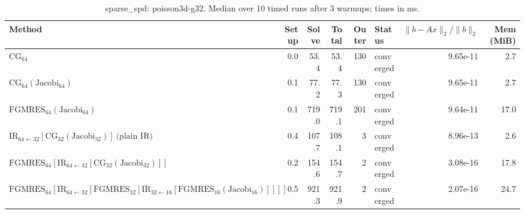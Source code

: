 \begin{table}[t]
\centering
\small
\caption{sparse_spd: poisson3d-g32. Median over 10 timed runs after 3 warmups; times in ms.}
\label{tab:sparse_spd-poisson3d-g32}
\begin{tabular}{lrrrrlrr}
\hline
Method & Setup & Solve & Total & Outer & Status & $\|b-Ax\|_2/\|b\|_2$ & Mem (MiB) \\
\hline
$\mathrm{CG}_{64}$ & 0.0 & 53.4 & 53.4 & 130 & converged & 9.65e-11 & 2.7 \\
$\mathrm{CG}_{64}(\mathrm{Jacobi}_{64})$ & 0.1 & 77.2 & 77.3 & 130 & converged & 9.65e-11 & 2.7 \\
$\mathrm{FGMRES}_{64}(\mathrm{Jacobi}_{64})$ & 0.1 & 719.0 & 719.1 & 201 & converged & 9.64e-11 & 17.0 \\
$\mathrm{IR}_{64\leftarrow 32}[\mathrm{CG}_{32}(\mathrm{Jacobi}_{32})]\ \text{(plain IR)}$ & 0.4 & 107.7 & 108.1 & 3 & converged & 8.96e-13 & 2.6 \\
$\mathrm{FGMRES}_{64}[\mathrm{IR}_{64\leftarrow 32}[\mathrm{CG}_{32}(\mathrm{Jacobi}_{32})]]$ & 0.2 & 154.6 & 154.7 & 2 & converged & 3.08e-16 & 17.8 \\
$\mathrm{FGMRES}_{64}[\mathrm{IR}_{64\leftarrow 32}[\mathrm{FGMRES}_{32}[\mathrm{IR}_{32\leftarrow 16}[\mathrm{FGMRES}_{16}(\mathrm{Jacobi}_{16})]]]]$ & 0.5 & 921.3 & 921.9 & 2 & converged & 2.07e-16 & 24.7 \\
\hline
\end{tabular}
\end{table}
